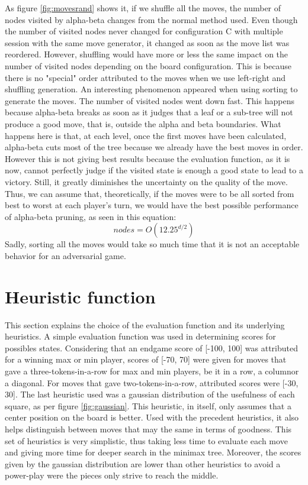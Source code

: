 \documentclass{article}
\begin{document}
As figure \ref{fig:movesrand} shows it, if we shuffle all the moves, the number of nodes visited by alpha-beta changes from the normal method used. Even though the number of visited nodes never changed for configuration C with multiple session with the same move generator, it changed as soon as the move list was reordered. However, shuffling would have more or less the same impact on the number of visited nodes depending on the board configuration. This is because there is no "special" order attributed to the moves when we use left-right and shuffling generation. An interesting phenomenon appeared when using sorting to generate the moves. The number of visited nodes went down fast. This happens because alpha-beta breaks as soon as it judges that a leaf or a sub-tree will not produce a good move, that is, outside the alpha and beta boundaries. What happens here is that, at each level, once the first moves have been calculated, alpha-beta cuts most of the tree because we already have the best moves in order. However this is not giving best results because the evaluation function, as it is now, cannot perfectly judge if the visited state is enough a good state to lead to a victory. Still, it greatly diminishes the uncertainty on the quality of the move. Thus, we can assume that, theoretically, if the moves were to be all sorted from best to worst at each player's turn, we would have the best possible performance of alpha-beta pruning, as seen in this equation: \[nodes = O(12.25^{d/2}) \] 
Sadly, sorting all the moves would take so much time that it is not an acceptable behavior for an adversarial game.
	
 

\section{Heuristic function}
This section explains the choice of the evaluation function and its underlying heuristics.
A simple evaluation function was used in determining scores for possibles states. Considering that an endgame score of [-100, 100] was attributed for a winning max or min player, scores of [-70, 70] were given for moves that gave a three-tokens-in-a-row for max and min players, be it in a row, a columnor a diagonal. For moves that gave two-tokens-in-a-row, attributed scores were [-30, 30]. The last heuristic used was a gaussian distribution of the usefulness of each square, as per figure \ref{fig:gaussian}. This heuristic, in itself, only assumes that a center position on the board is better. Used with the precedent heuristics, it also helps distinguish between moves that may the same in terms of goodness. This set of heuristics is very simplistic, thus taking less time to evaluate each move and giving more time for deeper search in the minimax tree. Moreover, the scores given by the gaussian distribution are lower than other heuristics to avoid a power-play were the pieces only strive to reach the middle.
\end{document}
